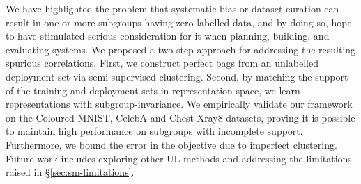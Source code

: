%
We have highlighted the problem that systematic bias or dataset curation can result in one or more
subgroups having zero labelled data, and by doing so, hope to have stimulated serious consideration
for it when planning, building, and evaluating systems.
%
We proposed a two-step approach for addressing the resulting spurious correlations.
%
First, we construct perfect bags from an unlabelled deployment set via semi-supervised clustering. 
%
Second, by matching the support of the training and deployment sets in representation space, we
learn representations with subgroup-invariance.
%
We empirically validate our frame\-work on the Coloured MNIST, CelebA and Chest-Xray8 datasets,
proving it is possible to maintain high performance on subgroups with incomplete support.
%
Furthermore, we bound the error in the objective due to imperfect clustering.
%
Future work includes exploring other \ac{UL} methods and addressing the limitations raised in
\S\ref{sec:sm-limitations}.

